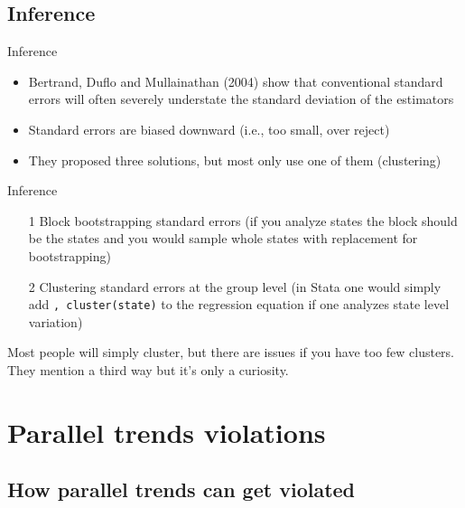 \documentclass{beamer}
\begin{document}
\subsection{Inference}

\begin{frame}{Inference}
	
	\begin{itemize}
	\item  Bertrand, Duflo and Mullainathan (2004) show that conventional standard errors will often severely understate the standard deviation of the estimators
	\item Standard errors are biased downward (i.e., too small, over reject)
	\item They proposed three solutions, but most only use one of them (clustering)
	\end{itemize}
\end{frame}


\begin{frame}{Inference}
	
		\begin{enumerate}
		\item[1 ] Block bootstrapping standard errors (if you analyze states the block should be the states and you would sample whole states with replacement for bootstrapping)
		\item[2 ] Clustering standard errors at the group level (in Stata one would simply add \texttt{, cluster(state)} to the regression equation if one analyzes state level variation)
		\end{enumerate}

\bigskip

Most people will simply cluster, but there are issues if you have too few clusters. They mention a third way but it's only a curiosity.
		
\end{frame}




\section{Parallel trends violations}

\subsection{How parallel trends can get violated}
\end{document}

